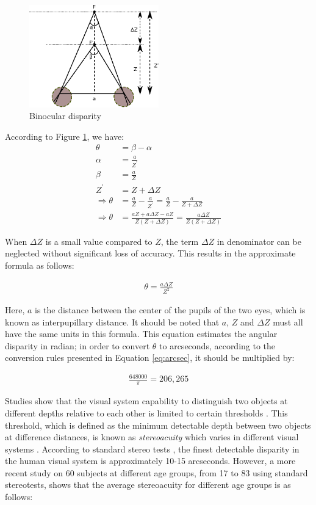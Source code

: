 \begin{figure}[!h]
\centering
\includegraphics[width=0.5\textwidth]{binocular}
\caption{Binocular disparity}
\label{fig:stereopsis}
\end{figure} 

According to Figure \ref{fig:stereopsis}, we have:
\begin{align}
\theta &= \beta - \alpha\\
\alpha &= \frac{a}{Z^{'}}\\
\beta &= \frac{a}{Z}\\
Z^{'} &= Z + \Delta Z\\
\Rightarrow \theta &= \frac{a}{Z} - \frac{a}{Z^{'}}= \frac{a}{Z} - \frac{a}{Z+\Delta Z} \\
\Rightarrow \theta &= \frac{aZ+a\Delta Z-aZ}{Z(Z+\Delta Z)} = \frac{a \Delta Z}{Z(Z+ \Delta Z)}
\end{align}

When $\Delta Z$ is a small value compared to $Z$, the term $\Delta Z$ in denominator can be neglected without 
significant loss of accuracy. This results in
the approximate formula as follows:

\begin{align}
\label{eq:stac}
\theta = \frac{a \Delta Z}{Z^{2}}
\end{align}

Here, $a$ is the distance between the center of the pupils of the two eyes, which is known as interpupillary distance.
It should be noted that $a$, $Z$ and $ \Delta Z$ must all have the same units in this formula. 
This equation estimates the angular disparity in radian; in order to convert $\theta$ to arcseconds, 
according to the conversion rules presented in Equation \ref{eq:arcsec}, it should be multiplied by:

\begin{align}
\frac {648000} {\pi} = 206,265
\end{align}

Studies show that the visual system capability to distinguish two objects at different depths relative to each other is limited to certain thresholds \cite{binr83,how95}.
This threshold, which is defined as the minimum detectable depth between two 
objects at difference distances, is known as {\it stereoacuity} which varies in different visual systems \cite{binr83,how95}. According to standard
stereo tests \cite{binr83}, the finest detectable disparity in the human visual system is approximately 10-15 arcseconds.
However, a more recent study on 60 subjects \cite{garn06} at different age groups, from 17 to 83 using standard stereotests, 
shows that the average stereoacuity for different age groups is as follows: \newline

